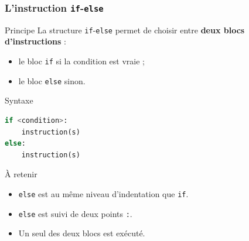 \documentclass[10pt]{beamer}
\begin{document}
\begin{frame}[containsverbatim]
	\frametitle{L'instruction \texttt{if}-\texttt{else}}
	
	
	\begin{block}{Principe}
		La structure \texttt{if}-\texttt{else} permet de choisir entre
		\textbf{deux blocs d'instructions} :
		
		\begin{itemize}
			\item le bloc \texttt{if} si la condition est vraie ;
			\item le bloc \texttt{else} sinon.
		\end{itemize}
	\end{block}
	
	\vspace{0.2cm}
	
\begin{alertblock}{Syntaxe}
\begin{lstlisting}[language=Python]
if <condition>:
	instruction(s)
else:
	instruction(s)
\end{lstlisting}
\end{alertblock}
	
	
	\vspace{0.15cm}
	
	\begin{exampleblock}{À retenir}
		\begin{itemize}
			\item \texttt{else} est au même niveau d'indentation que \texttt{if}.
			\item \texttt{else} est suivi de deux points \texttt{:}.
			\item Un seul des deux blocs est exécuté.
		\end{itemize}
	\end{exampleblock}

	
\end{frame}
\end{document}
